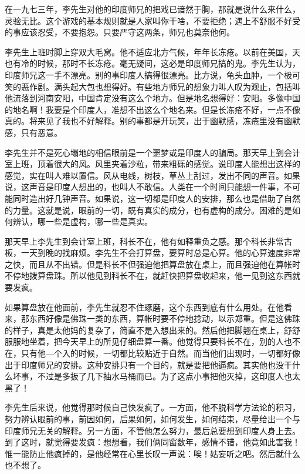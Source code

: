 在一九七三年，李先生对他的印度师兄的把戏已谙然于胸，那就是说什么来什么，灵验无比。这个游戏的基本规则就是人家叫你干啥，不要拒绝；遇上不舒服不好受的事应该忍受，不要抱怨。只要严守这两条，师兄也莫奈他何。 

李先生上班时脚上穿双大毛窝。他不适应北方气候，年年长冻疮。以前在美国，天也有冷的时候，那时不长冻疮。毫无疑间，这必是印度师兄搞的鬼。李先生认为，印度师兄这一手不漂亮。别的事印度人搞得很漂亮。比方说，龟头血肿，一个极可笑的恶作剧。满头起大包也想得好。有些地方师兄的想象力叫人叹为观止，包括叫他流落到河南安阳，中国肯定没有这么个地方。但是地名想得好：安阳。多像中国的地名啊！我要是个印度人，准想不出这么个地名来。但是长冻疮不好，一点不像真的。将来见了我也不好解释。别的事都是开玩笑，出于幽默感，冻疮里没有幽默感，只有恶意。 

李先生并不是死心塌地的相信眼前是一个噩梦或是印度人的骗局。那天早上到会计室上班，顶着很大的风。风里夹着沙粒，带来粗砾的感觉。说印度人能想出这样的感觉，实在叫人难以置信。风从电线，树枝，草丛上刮过，发出不同的声音。如果说，这声音是印度人想出的，也叫人不敢信。人类在一个时间只能想一件事，不可能同时造出好几钟声音。如果说，这一切都是印度人的安排，那么也是借助了自然的力量。这就是说，眼前的一切，既有真实的成分，也有虚构的成分。困难的是如何辨认，哪一些是虚构，哪一些是真实。 

那天早上李先生到会计室上班，科长不在，他有如释重负之感。那个科长非常古板，一天到晚的找麻烦。李先生不会打算盘，要算时总是心算。他的心算速度非常之快，而且从不出错。但是科长不但强迫他把算盘放在桌上，而且强迫他在算帐时不停地拨算盘珠。所以他见到科长不在，就赶快把算盘收起来，他一见到这东西就要发疯。 

如果算盘放在他面前，李先生就忍不住琢磨，这个东西到底有什么用处。在他看来，那东西好像是佛珠一类的东西，算帐时要不停地捻动，以示郑重。但是这佛珠的样子，真是太他妈的复杂了，简直不是入想出来的。然后他把脚翘在桌上，舒舒服服地坐着，把今天早上的所见仔细盘算一番。他觉得只要科长不在，别的人也不在，只有他—个入的时候，一切都比较贴近于自然。而当他们出现时，一切都好像出于印度师兄的安排。这种安排只有一个目的，就是要把他逼疯。其实他也没干什么坏事，不过是多扳了几下抽水马桶而已。为了这点小事把他灭掉，这印度人也太黑了！ 

李先生后来说，他觉得那时候自己快发疯了。一方面，他不脱科学方法论的积习，努力辨认眼前的事，前因如何，后果如何，如何发生，如何结束，尽量给出一个与印度师兄无关的解释。另一方面，不管他怎么努力，最后总要想到印度人身上去。到了这时，就觉得要发疯：想想看，我们俩同窗数年，感情不错，他竟如此害我！惟一能防止他疯掉的，是他经常在心里长叹一声说：唉！姑妄听之吧。然后就什么也不想了。 

